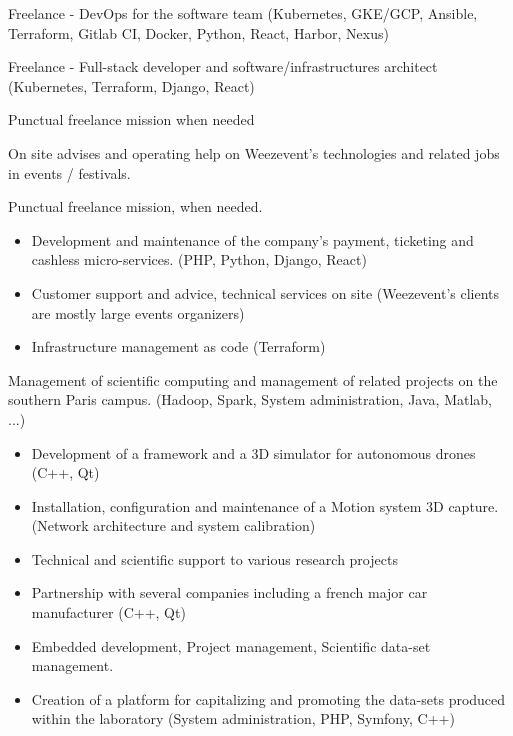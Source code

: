 

Freelance - DevOps for the software team (Kubernetes, GKE/GCP, Ansible, Terraform, Gitlab CI, Docker, Python, React, Harbor, Nexus)

\divider

Freelance - Full-stack developer and software/infrastructures architect (Kubernetes, Terraform, Django, React)

Punctual freelance mission when needed

\divider

On site advises and operating help on Weezevent's technologies and related jobs in events / festivals.

Punctual freelance mission, when needed.

\divider

\begin{itemize}
    \item Development and maintenance of the company's payment, ticketing and cashless micro-services. (PHP, Python, Django, React)
    \item Customer support and advice, technical services on site (Weezevent's clients are mostly large events organizers)
    \item Infrastructure management as code (Terraform)
\end{itemize}

\divider

Management of scientific computing and management of related projects on the southern Paris campus. (Hadoop, Spark, System administration, Java, Matlab, ...)

\divider

\begin{itemize}
    \item Development of a framework and a 3D simulator for autonomous drones (C++, Qt)
    \item Installation, configuration and maintenance of a Motion system 3D capture. (Network architecture and system calibration)
    \item Technical and scientific support to various research projects
    \item Partnership with several companies including a french major car manufacturer (C++, Qt)
    \item Embedded development, Project management, Scientific data-set management.
    \item Creation of a platform for capitalizing and promoting the data-sets produced within the laboratory (System administration, PHP, Symfony, C++)
\end{itemize}